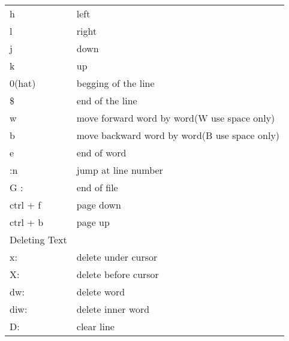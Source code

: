 \documentclass{book}
\begin{document}
\begin{longtable}{ll}
			h                                           & left                                              \\
			l                                           & right                                             \\
			j                                           & down                                              \\
			k                                           & up                                                \\
			0(hat)                                      & begging of the line                               \\
			\$                                          & end of the line                                   \\
			w                                           & move forward word by word(W use space only)       \\
			b                                           & move backward word by word(B use space only)      \\
			e                                           & end of word                                       \\
			:n                                          & jump at line number                               \\
			G :                                         & end of file                                       \\
			ctrl + f                                    & page down                                         \\
			ctrl + b                                    & page up                                           \\ \hline
			Deleting Text                               &                                                   \\ \hline
			x:                                          & delete under cursor                               \\
			X:                                          & delete before cursor                              \\
			dw:                                         & delete word                                       \\
			diw:                                        & delete inner word                                 \\
			D:                                          & clear line                                        \\

\end{longtable}
\end{document}
